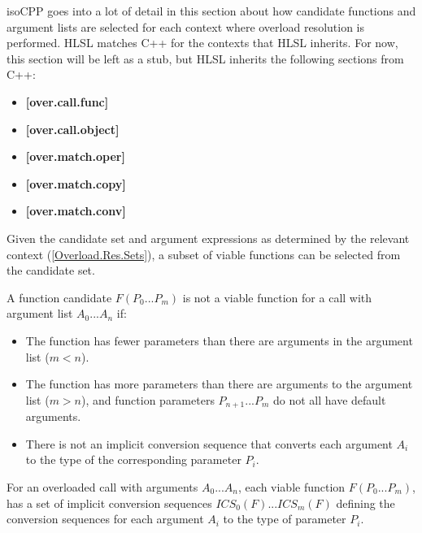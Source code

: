 \begin{note}
  \gls{isoCPP} goes into a lot of detail in this section about how candidate
  functions and argument lists are selected for each context where overload
  resolution is performed. HLSL matches C++ for the contexts that HLSL inherits.
  For now, this section will be left as a stub, but HLSL inherits the following
  sections from C++:
  \begin{itemize}
    \item \textbf{[over.call.func]}
    \item \textbf{[over.call.object]}
    \item \textbf{[over.match.oper]}
    \item \textbf{[over.match.copy]}
    \item \textbf{[over.match.conv]}
  \end{itemize}
\end{note}


\p Given the candidate set and argument expressions as determined by the
relevant context (\ref{Overload.Res.Sets}), a subset of viable functions can be
selected from the candidate set.

\p A function candidate \(F(P_0 ... P_m)\) is not a viable function for a call
with argument list \(A_0 ... A_n\) if:
\begin{itemize}
  \item The function has fewer parameters than there are
  arguments in the argument list (\(m < n \)).
  \item The function has more parameters than there are arguments to the
  argument list (\(m > n \)), and function parameters \( P_{n+1} ... P_m \) do not
  all have default arguments.
  \item There is not an implicit conversion sequence that converts each argument
  \(A_i\) to the type of the corresponding parameter \(P_i\).
\end{itemize}


\p For an overloaded call with arguments \(A_0 ... A_n\), each viable function
\(F(P_0 ... P_m)\), has a set of implicit conversion sequences \(ICS_0(F) ...
ICS_m(F)\) defining the conversion sequences for each argument \(A_i\) to the
type of parameter \(P_i\).

